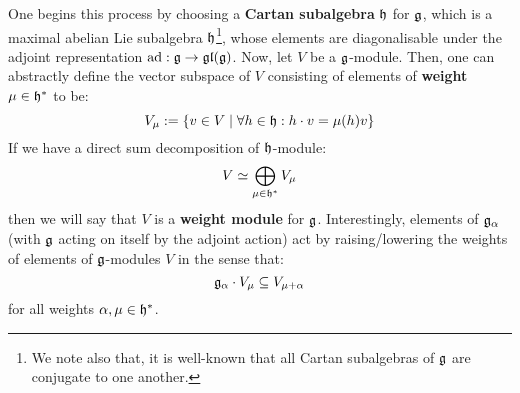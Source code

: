         One begins this process by choosing a \textbf{Cartan subalgebra} $\mathfrak{h}$ for $\mathfrak{g}$, which is a maximal abelian Lie subalgebra $\mathfrak{h}$\footnote{We note also that, it is well-known that all Cartan subalgebras of $\mathfrak{g}$ are conjugate to one another.}, whose elements are diagonalisable under the adjoint representation $\mathrm{ad}: \mathfrak{g} \to \mathfrak{gl}(\mathfrak{g})$. Now, let $V$ be a $\mathfrak{g}$-module. Then, one can abstractly define the vector subspace of $V$ consisting of elements of \textbf{weight} $\mu \in \mathfrak{h}^*$ to be:
            $$V_{\mu} := \{v \in V \mid \forall h \in \mathfrak{h}: h \cdot v = \mu(h) v\}$$
        If we have a direct sum decomposition of $\mathfrak{h}$-module:
            $$V \simeq \bigoplus_{\mu \in \mathfrak{h}^*} V_{\mu}$$
        then we will say that $V$ is a \textbf{weight module} for $\mathfrak{g}$. Interestingly, elements of $\mathfrak{g}_{\alpha}$ (with $\mathfrak{g}$ acting on itself by the adjoint action) act by raising/lowering the weights of elements of $\mathfrak{g}$-modules $V$ in the sense that:
            $$\mathfrak{g}_{\alpha} \cdot V_{\mu} \subseteq V_{\mu + \alpha}$$
        for all weights $\alpha, \mu \in \mathfrak{h}^*$. 
        
